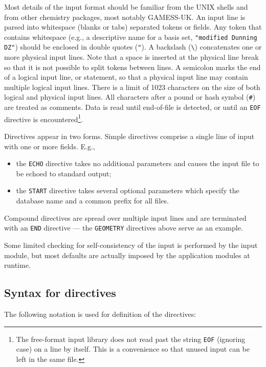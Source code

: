 Most details of the input format should be familiar from the UNIX
shells and from other chemistry packages, most notably GAMESS-UK.  An
input line is parsed into whitespace (blanks or tabs) separated tokens
or fields.  Any token that contains whitespace (e.g., a descriptive
name for a basis set, \verb+"modified Dunning DZ"+) should be enclosed
in double quotes (\verb+"+).  A backslash (\verb+\+) concatenates one
or more physical input lines. Note that a space is inserted at the
physical line break so that it is not possible to split tokens between
lines.  A semicolon marks the end of a logical input line, or
statement, so that a physical input line may contain multiple logical
input lines.  There is a limit of 1023 characters on the size of both
logical and physical input lines.  All characters after a pound or
hash symbol (\verb+#+) are treated as comments.  Data is read until
end-of-file is detected, or until an \verb+EOF+ directive is
encountered\footnote{The
  free-format input library does not read past the string \verb+EOF+
  (ignoring case) on a line by itself.  This is a convenience so that
  unused input can be left in the same file.}.

Directives appear in two forms.  Simple directives comprise a single
line of input with one or more fields.  E.g., 
\begin{itemize}
\item the \verb+ECHO+ directive takes no additional parameters 
  and causes the input file to be echoed to standard output;
\item the \verb+START+ directive takes several optional
      parameters which specify the database name and a common prefix
      for all files.
\end{itemize}
Compound directives are spread over multiple input lines and
are terminated with an \verb+END+ directive --- the 
\verb+GEOMETRY+ directives above serve as an example. 

Some limited checking for self-consistency of the input is performed
by the input module, but most defaults are actually imposed by the
application modules at runtime. 

\subsection{Syntax for directives}

The following notation is used for definition of the directives:

